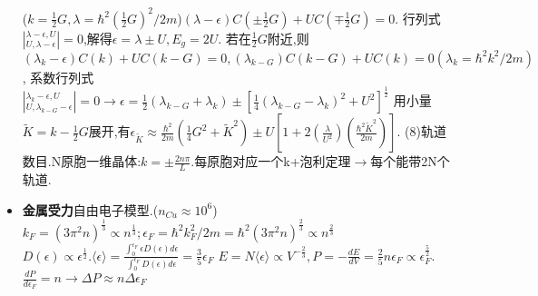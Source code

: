\documentclass[UTF8,a4paper,1pt,twocolumn]{ctexart}
\begin{document}
\begin{itemize}
  ($k=\frac{1}{2}G,\lambda=\hbar^2(\frac{1}{2}G)^2/2m$)$(\lambda-\epsilon)C(\pm\frac{1}{2}G)+UC(\mp\frac{1}{2}G)=0$.
  行列式$|^{\lambda-\epsilon,U}_{U,\lambda-\epsilon}|=0$,解得$\epsilon=\lambda\pm U,E_g=2U$.
  若在$\frac{1}{2}G$附近,则$(\lambda_k-\epsilon)C(k)+UC(k-G)=0,(\lambda_{k-G})C(k-G)+UC(k)=0(\lambda_k=\hbar^2k^2/2m)$,
  系数行列式$|^{\lambda_k-\epsilon,U}_{U,\lambda_{k-G}-\epsilon}|=0\rightarrow\epsilon=\frac{1}{2}(\lambda_{k-G}+\lambda_k)\pm[\frac{1}{4}(\lambda_{k-G}-\lambda_k)^2+U^2]^\frac{1}{2}$
  用小量$\widetilde{K}=k-\frac{1}{2}G$展开,有$\epsilon_{\widetilde{K}}\approx\frac{\hbar^2}{2m}(\frac{1}{4}G^2+\widetilde{K}^2)\pm U[1+2(\frac{\lambda}{U^2})(\frac{\hbar^2\widetilde{K}^2}{2m})]$.
  (8)轨道数目.N原胞一维晶体:$k=\pm\frac{2n\pi}{L}$.每原胞对应一个k+泡利定理$\rightarrow$每个能带2N个轨道.

  \item \textbf{金属受力}自由电子模型.($n_{Cu}\approx 10^{6}$)
  $k_F=(3\pi^2n)^{\frac{1}{3}}\propto n^{\frac{1}{3}};\epsilon_F=\hbar^2 k_F^2/2m=\hbar^2(3\pi^2n)^{\frac{2}{3}}\propto n^\frac{2}{3}$
  $D(\epsilon)\propto\epsilon^{\frac{1}{2}}.\langle\epsilon\rangle=\frac{\int_0^{\epsilon_F}\epsilon D(\epsilon)d\epsilon}{\int_0^{\epsilon_F}D(\epsilon)d\epsilon}=\frac{3}{5}\epsilon_F$
  $E=N\langle\epsilon\rangle\propto V^{-\frac{2}{3}},P=-\frac{dE}{dV}=\frac{2}{5}n\epsilon_F\propto\epsilon_F^{\frac{5}{2}}$.
  $\frac{dP}{d\epsilon_F}=n\rightarrow\Delta P\approx n\Delta \epsilon_F$

\end{itemize}



\end{document}
